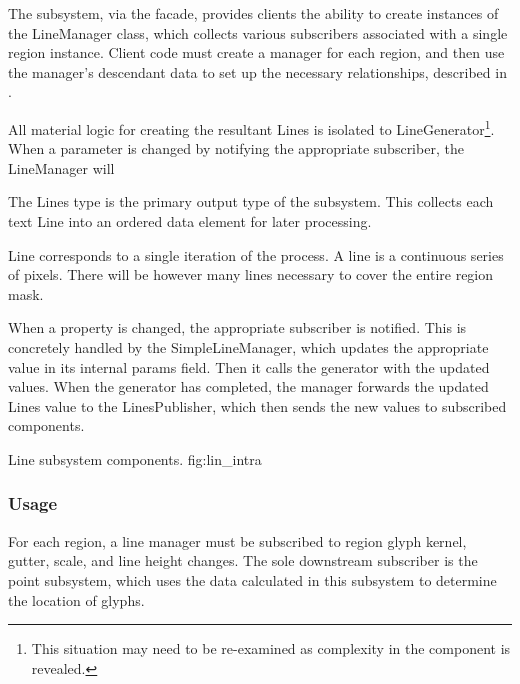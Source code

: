 The subsystem, via the facade, provides clients the ability to create instances of the LineManager class, which collects various subscribers associated with a single region instance.
Client code must create a manager for each region, and then use the manager's descendant data to set up the necessary relationships, described in .

All material logic for creating the resultant Lines is isolated to LineGenerator\footnote{This situation may need to be re-examined as complexity in the component is revealed.}.
When a parameter is changed by notifying the appropriate subscriber, the LineManager will

The Lines type is the primary output type of the subsystem.
This collects each text Line into an ordered data element for later processing.

Line corresponds to a single iteration of the process.
A line is a continuous series of pixels.
There will be however many lines necessary to cover the entire region mask.

When a property is changed, the appropriate subscriber is notified.
This is concretely handled by the SimpleLineManager, which updates the appropriate value in its internal params field.
Then it calls the generator with the updated values.
When the generator has completed, the manager forwards the updated Lines value to the LinesPublisher, which then sends the new values to subscribed components.


{Line subsystem components.}
{fig:lin_intra}


\subsubsection{Usage}
\label{sec:line_usage}
For each region, a line manager must be subscribed to region glyph kernel, gutter, scale, and line height changes.
The sole downstream subscriber is the point subsystem, which uses the data calculated in this subsystem to determine the location of glyphs.